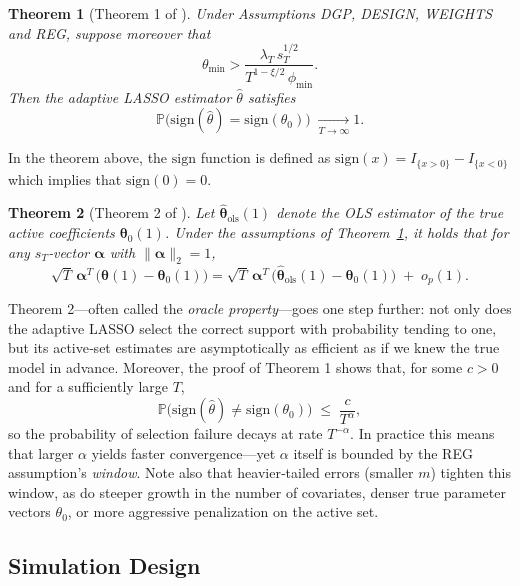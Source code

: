 \documentclass[10pt,a4paper,oneside]{article}
\newcommand{\Prob}{\mathbb{P}}
\newtheorem{theorem}{Theorem}
\begin{document}
\begin{theorem}[Theorem 1 of \cite{MEDEIROS2016255}] Under Assumptions \textup{DGP}, \textup{DESIGN}, \textup{WEIGHTS} and \textup{REG}, suppose moreover that
\[
\theta_{\min}
>
\frac{\lambda_T\,s_T^{1/2}}{
  T^{1-\xi/2}\,\phi_{\min}
}.
\]
Then the adaptive LASSO estimator $\hat\theta$ satisfies
\[
\Prob\bigl(\mathrm{sign}(\hat\theta)=\mathrm{sign}(\theta_0)\bigr)
\;\xrightarrow[T \rightarrow \infty]{} 1.
\]
\label{thm:1_medeiros}
\end{theorem}

In the theorem above, the $\mathrm{sign}$ function is defined as $\mathrm{sign}(x) = I_{\{ x > 0 \}} - I_{\{ x < 0 \}}$ which implies that $\mathrm{sign}(0) = 0$.

\begin{theorem}[Theorem 2 of \cite{MEDEIROS2016255}] Let $\hat{\boldsymbol{\theta}}_{\text{ols}}{(1)}$ denote the OLS estimator of the true active coefficients $\boldsymbol{\theta}_0{(1)}$.  Under the assumptions of Theorem~\ref{thm:1_medeiros}, it holds that for any $s_T$‑vector $\boldsymbol{\alpha}$ with $\|\boldsymbol{\alpha}\|_2=1$,
\[
\sqrt{T}\,\boldsymbol{\alpha}^T\,\bigl(\hat{\boldsymbol{\theta}}{(1)} - \boldsymbol{\theta}_0{(1)}\bigr)
=
\sqrt{T}\,\boldsymbol{\alpha}^T\,\bigl(\hat{\boldsymbol{\theta}}_{\text{ols}}{(1)} - \boldsymbol{\theta}_0{(1)}\bigr)
\;+\;o_p(1).
\]
\end{theorem}

Theorem 2—often called the \textit{oracle property}—goes one step further: not only does the adaptive LASSO select the correct support with probability tending to one, but its active‐set estimates are asymptotically as efficient as if we knew the true model in advance. Moreover, the proof of Theorem 1 shows that, for some $c>0$ and for a sufficiently large \(T\),
\begin{equation}
\Prob\bigl(\mathrm{sign}(\hat\theta)\neq\mathrm{sign}(\theta_0)\bigr)
\;\le\;
\frac{c}{T^\alpha},
\label{eq:decay_rate}
\end{equation}
so the probability of selection failure decays at rate \(T^{-\alpha}\). In practice this means that larger \(\alpha\) yields faster convergence—yet \(\alpha\) itself is bounded by the REG assumption’s \textit{window}. Note also that heavier‐tailed errors (smaller \(m\)) tighten this window, as do steeper growth in the number of covariates, denser true parameter vectors \(\theta_0\), or more aggressive penalization on the active set.

\subsection{Simulation Design}
\label{subsec:simulation_design}
\end{document}
